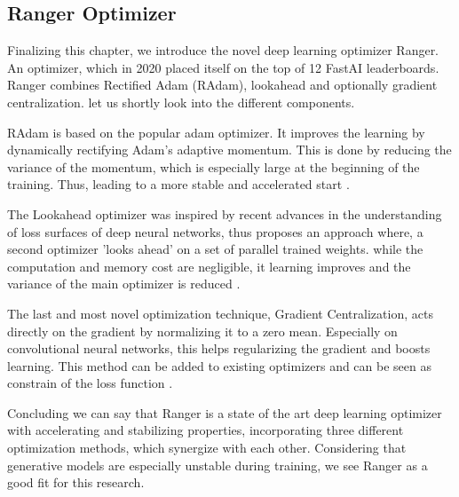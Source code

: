 \subsection{Ranger Optimizer}
\label{sec3:ranger}

Finalizing this chapter, we introduce the novel deep learning optimizer Ranger. An optimizer, which in 2020 placed itself on the top of 12 FastAI leaderboards. Ranger combines Rectified Adam (RAdam), lookahead and optionally gradient centralization. let us shortly look into the different components.

RAdam is based on the popular adam optimizer. It improves the learning by dynamically rectifying Adam's adaptive momentum. This is done by reducing the variance of the momentum, which is especially large at the beginning of the training. Thus, leading to a more stable and accelerated start \cite{liu_variance_2020}.

The Lookahead optimizer was inspired by recent advances in the understanding of loss surfaces of deep neural networks, thus proposes an approach where, a second optimizer 'looks ahead' on a set of parallel trained weights. while the computation and memory cost are negligible, it learning improves and the variance of the main optimizer is reduced \cite{zhang_lookahead_2019}.

The last and most novel optimization technique, Gradient Centralization, acts directly on the gradient by normalizing it to a zero mean. Especially on convolutional neural networks, this helps regularizing the gradient and boosts learning. This method can be added to existing optimizers and can be seen as constrain of the loss function \cite{yong_gradient_2020}.

Concluding we can say that Ranger is a state of the art deep learning optimizer with accelerating and stabilizing properties, incorporating three different optimization methods, which synergize with each other. Considering that generative models are especially unstable during training, we see Ranger as a good fit for this research.



